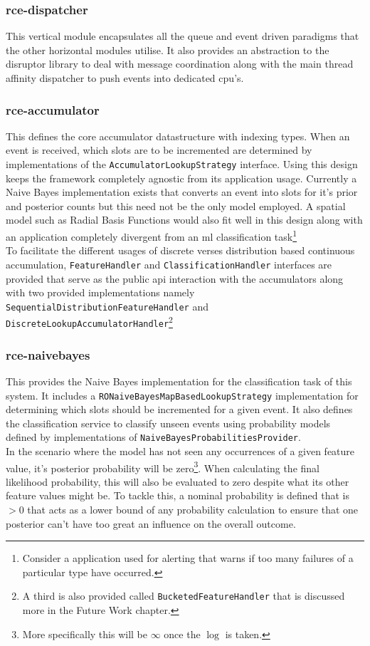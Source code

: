 \documentclass[a4paper,11pt]{scrreprt}
\begin{document}
\subsubsection{rce-dispatcher}
This vertical module encapsulates all the queue and event driven paradigms that the other horizontal modules utilise. It also provides an abstraction to the disruptor library to deal with message coordination along with the main thread affinity dispatcher to push events into dedicated \acrshort{cpu}'s.

\subsubsection{rce-accumulator}
This defines the core accumulator datastructure with indexing types. When an event is received, which slots are to be incremented are determined by implementations of the \verb|AccumulatorLookupStrategy| interface. Using this design keeps the framework completely agnostic from its application usage. Currently a Naive Bayes implementation exists that converts an event into slots for it's prior and posterior counts but this need not be the only model employed. A spatial model such as Radial Basis Functions would also fit well in this design along with an application completely divergent from an \acrshort{ml} classification task\footnote{Consider a application used for alerting that warns if too many failures of a particular type have occurred.}\\
To facilitate the different usages of discrete verses distribution based continuous accumulation, \verb|FeatureHandler| and \verb|ClassificationHandler| interfaces are provided that serve as the public \acrshort{api} interaction with the accumulators along with two provided implementations namely \verb|SequentialDistributionFeatureHandler| and\\ \verb|DiscreteLookupAccumulatorHandler|\footnote{A third is also provided called \verb|BucketedFeatureHandler| that is discussed more in the Future Work chapter.}

\subsubsection{rce-naivebayes}
This provides the Naive Bayes implementation for the classification task of this system. It includes a \verb|RONaiveBayesMapBasedLookupStrategy| implementation for determining which slots should be incremented for a given event. It also defines the classification service to classify unseen events using probability models defined by implementations of \verb|NaiveBayesProbabilitiesProvider|. \\In the scenario where the model has not seen any occurrences of a given feature value, it's posterior probability will be zero\footnote{More specifically this will be \(\infty\) once the \(\log\) is taken.}. When calculating the final likelihood probability, this will also be evaluated to zero despite what its other feature values might be. To tackle this, a nominal probability is defined that is \(> 0\) that acts as a lower bound of any probability calculation to ensure that one posterior can't have too great an influence on the overall outcome.  
\end{document}
